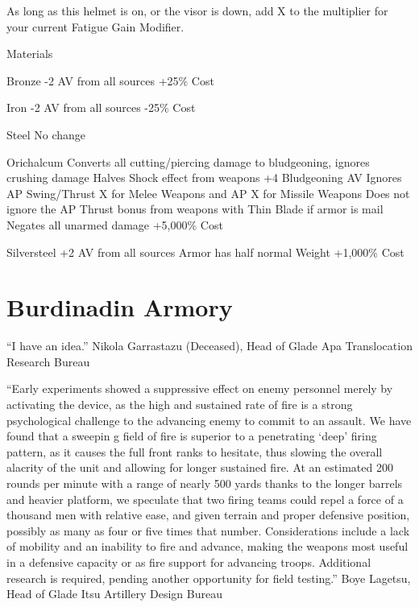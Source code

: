 \documentclass[oneside,11pt,english]{book}
\begin{document}
As long as this helmet is on, or the visor is down, add X to the multiplier for your current Fatigue 
Gain Modifier.

Materials


Bronze
-2 AV from all sources
+25\% Cost

Iron
-2 AV from all sources
-25\% Cost

Steel
No change

Orichalcum 
Converts all cutting/piercing damage to bludgeoning, ignores crushing damage
Halves Shock effect from weapons
+4 Bludgeoning AV
Ignores AP Swing/Thrust X for Melee Weapons and AP X for Missile Weapons
Does not ignore the AP Thrust bonus from weapons with Thin Blade if armor is mail
Negates all unarmed damage
+5,000\% Cost

Silversteel
+2 AV from all sources
Armor has half normal Weight 
+1,000\% Cost
\chapter{Burdinadin Armory}
\startcontents[chapters]
\clearpage
“I have an idea.” 
Nikola Garrastazu (Deceased), Head of Glade Apa Translocation Research Bureau 

 

“Early experiments showed a suppressive effect on enemy personnel merely by activating the device, as the high and sustained 
rate of fire is a strong psychological challenge to the advancing enemy to commit to an assault. We have found that a sweepin g 
field of fire is superior to a penetrating ‘deep’ firing pattern, as it causes the full front ranks to hesitate, thus slowing the overall 
alacrity of the unit and allowing for longer sustained fire. At an estimated 200 rounds per minute with a range of nearly 500 
yards thanks to the longer barrels and heavier platform, we speculate that two firing teams could repel a force of a thousand men 
with relative ease, and given terrain and proper defensive position, possibly as many as four or five times that number. 
Considerations include a lack of mobility and an inability to fire and advance, making the weapons most useful in a defensive 
capacity or as fire support for advancing troops. Additional research is required, pending another opportunity for field testing.” 
Boye Lagetsu, Head of Glade Itsu Artillery Design Bureau 

 
\end{document}
